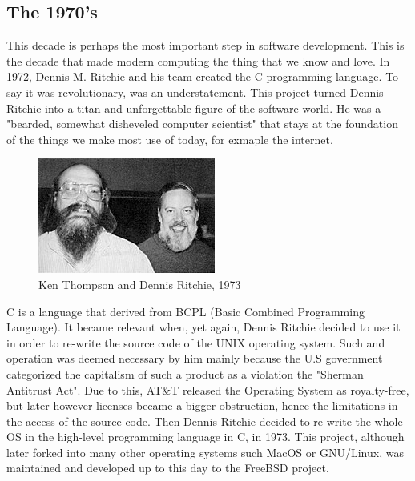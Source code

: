 \subsection{The 1970's}
This decade is perhaps the most important step in software development.
This is the decade that made modern computing the thing that we know and love.
In 1972, Dennis M.
Ritchie and his team created the C programming language.
To say it was revolutionary, was an understatement.
This project turned Dennis Ritchie into a titan and unforgettable figure of the software world.
He was a "bearded, somewhat disheveled computer scientist"\cite{ritchieJobs} that stays at the foundation of the things we make most use of today, for exmaple the internet.
\begin{figure}[htbp]
    \centering
    \includegraphics[scale=0.7]{pictures/KenThompson_and_DennisRitchie1973.jpg}
    \caption{Ken Thompson and Dennis Ritchie, 1973}
    \label{unixMakers}
\end{figure}

\par
C is a language that derived from BCPL (Basic Combined Programming Language).
It became relevant when, yet again, Dennis Ritchie decided to use it in order to re-write the source code of the UNIX operating system.
Such and operation was deemed necessary by him mainly because the U.S government categorized the capitalism of such a product as a violation the "Sherman Antitrust Act"\cite{unixRepo}.
Due to this, AT\&T released the Operating System as royalty-free, but later however licenses became a bigger obstruction, hence the limitations in the access of the source code.
Then Dennis Ritchie decided to re-write the whole OS in the high-level programming language in C, in 1973.
This project, although later forked into many other operating systems such MacOS or GNU/Linux, was maintained and developed up to this day to the FreeBSD project.


